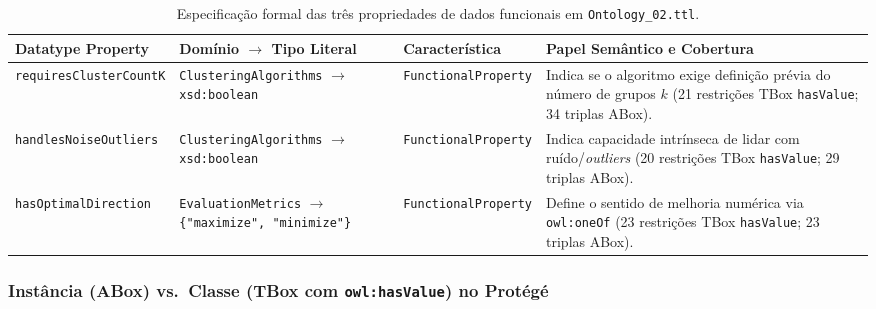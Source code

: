 \documentclass[11pt,a4paper]{article}
\newcommand{\onto}[1]{\texttt{#1}}
\begin{document}
\begin{table}[htbp]
\centering
\caption{Especificação formal das três propriedades de dados funcionais em \texttt{Ontology\_02.ttl}.}
\label{tab:dataprops}
\footnotesize
\begin{tabularx}{\textwidth}{@{}p{3.6cm}p{3.9cm}p{3.1cm}>{\raggedright\arraybackslash}X@{}}
\toprule
\textbf{Datatype Property} & \textbf{Domínio $\rightarrow$ Tipo Literal} & \textbf{Característica} & \textbf{Papel Semântico e Cobertura} \\
\midrule
\onto{requiresClusterCountK} & \onto{ClusteringAlgorithms} $\rightarrow$ \onto{xsd:boolean} & \onto{FunctionalProperty} & Indica se o algoritmo exige definição prévia do número de grupos $k$ (21 restrições TBox \onto{hasValue}; 34 triplas ABox). \\
\addlinespace[3pt]
\onto{handlesNoiseOutliers} & \onto{ClusteringAlgorithms} $\rightarrow$ \onto{xsd:boolean} & \onto{FunctionalProperty} & Indica capacidade intrínseca de lidar com ruído/\emph{outliers} (20 restrições TBox \onto{hasValue}; 29 triplas ABox). \\
\addlinespace[3pt]
\onto{hasOptimalDirection} & \onto{EvaluationMetrics} $\rightarrow$ \onto{\{"maximize", "minimize"\}} & \onto{FunctionalProperty} & Define o sentido de melhoria numérica via \onto{owl:oneOf} (23 restrições TBox \onto{hasValue}; 23 triplas ABox). \\
\bottomrule
\end{tabularx}
\end{table}

\subsubsection{Instância (ABox) vs.\ Classe (TBox com \onto{owl:hasValue}) no Protégé}
\end{document}

